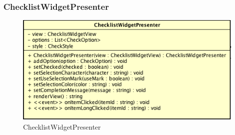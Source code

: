 \subsubsection{ChecklistWidgetPresenter}

\label{ChecklistWidgetPresenter}
\begin{figure}[ht]
	\centering
	\includegraphics[scale=0.5]{Sezioni/SottosezioniST/img/ChecklistWidgetPresenter.png}
	\caption{ChecklistWidgetPresenter}
\end{figure}

